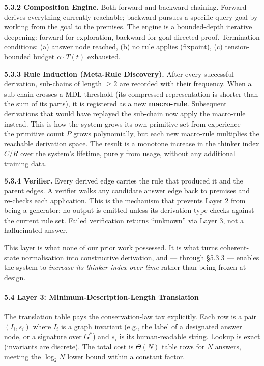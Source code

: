 \documentclass[
  11pt,
  a4paper,
]{article}
\begin{document}
\textbf{5.3.2 Composition Engine.} Both forward and backward chaining.
Forward derives everything currently reachable; backward pursues a
specific query goal by working from the goal to the premises. The engine
is a bounded-depth iterative deepening: forward for exploration,
backward for goal-directed proof. Termination conditions: (a) answer
node reached, (b) no rule applies (fixpoint), (c) tension-bounded budget
\(\alpha \cdot T(t)\) exhausted.

\textbf{5.3.3 Rule Induction (Meta-Rule Discovery).} After every
successful derivation, sub-chains of length \(\geq 2\) are recorded with
their frequency. When a sub-chain crosses a MDL threshold (its
compressed representation is shorter than the sum of its parts), it is
registered as a new \textbf{macro-rule}. Subsequent derivations that
would have replayed the sub-chain now apply the macro-rule instead. This
is how the system grows its own primitive set from experience --- the
primitive count \(P\) grows polynomially, but each new macro-rule
multiplies the reachable derivation space. The result is a monotone
increase in the thinker index \(C/R\) over the system's lifetime, purely
from usage, without any additional training data.

\textbf{5.3.4 Verifier.} Every derived edge carries the rule that
produced it and the parent edges. A verifier walks any candidate answer
edge back to premises and re-checks each application. This is the
mechanism that prevents Layer 2 from being a generator: no output is
emitted unless its derivation type-checks against the current rule set.
Failed verification returns ``unknown'' via Layer 3, not a hallucinated
answer.

This layer is what none of our prior work possessed. It is what turns
coherent-state normalisation into constructive derivation, and ---
through §5.3.3 --- enables the system to \emph{increase its thinker
index over time} rather than being frozen at design.

\paragraph{5.4 Layer 3: Minimum-Description-Length
Translation}\label{layer-3-minimum-description-length-translation}

The translation table pays the conservation-law tax explicitly. Each row
is a pair \((I_i, s_i)\) where \(I_i\) is a graph invariant (e.g., the
label of a designated answer node, or a signature over \(G^*\)) and
\(s_i\) is its human-readable string. Lookup is exact (invariants are
discrete). The total cost is \(\Theta(N)\) table rows for \(N\) answers,
meeting the \(\log_2 N\) lower bound within a constant factor.
\end{document}
